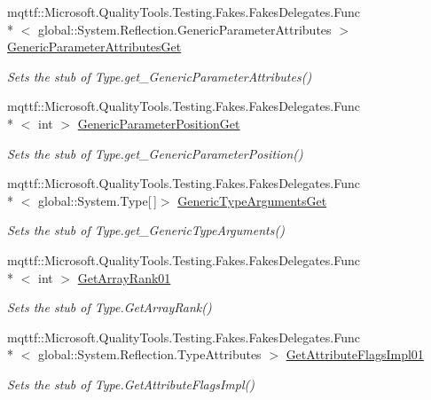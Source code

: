 \begin{DoxyCompactItemize}
mqttf\-::\-Microsoft.\-Quality\-Tools.\-Testing.\-Fakes.\-Fakes\-Delegates.\-Func\\*
$<$ global\-::\-System.\-Reflection.\-Generic\-Parameter\-Attributes $>$ \hyperlink{class_system_1_1_fakes_1_1_stub_type_adeba7a167b13b63eb2571e544e0340ac}{Generic\-Parameter\-Attributes\-Get}
\begin{DoxyCompactList}\small\item\em Sets the stub of Type.\-get\-\_\-\-Generic\-Parameter\-Attributes()\end{DoxyCompactList}\item 
mqttf\-::\-Microsoft.\-Quality\-Tools.\-Testing.\-Fakes.\-Fakes\-Delegates.\-Func\\*
$<$ int $>$ \hyperlink{class_system_1_1_fakes_1_1_stub_type_a82066736482e0b9313caa87f60b262e2}{Generic\-Parameter\-Position\-Get}
\begin{DoxyCompactList}\small\item\em Sets the stub of Type.\-get\-\_\-\-Generic\-Parameter\-Position()\end{DoxyCompactList}\item 
mqttf\-::\-Microsoft.\-Quality\-Tools.\-Testing.\-Fakes.\-Fakes\-Delegates.\-Func\\*
$<$ global\-::\-System.\-Type\mbox{[}$\,$\mbox{]}$>$ \hyperlink{class_system_1_1_fakes_1_1_stub_type_a16787b80f78426afb73499a5345a8b8b}{Generic\-Type\-Arguments\-Get}
\begin{DoxyCompactList}\small\item\em Sets the stub of Type.\-get\-\_\-\-Generic\-Type\-Arguments()\end{DoxyCompactList}\item 
mqttf\-::\-Microsoft.\-Quality\-Tools.\-Testing.\-Fakes.\-Fakes\-Delegates.\-Func\\*
$<$ int $>$ \hyperlink{class_system_1_1_fakes_1_1_stub_type_a5bc703f4f72f6cea430a19d056cd1b5d}{Get\-Array\-Rank01}
\begin{DoxyCompactList}\small\item\em Sets the stub of Type.\-Get\-Array\-Rank()\end{DoxyCompactList}\item 
mqttf\-::\-Microsoft.\-Quality\-Tools.\-Testing.\-Fakes.\-Fakes\-Delegates.\-Func\\*
$<$ global\-::\-System.\-Reflection.\-Type\-Attributes $>$ \hyperlink{class_system_1_1_fakes_1_1_stub_type_afdb0f5ae2c671e516805ec7fbc27e91b}{Get\-Attribute\-Flags\-Impl01}
\begin{DoxyCompactList}\small\item\em Sets the stub of Type.\-Get\-Attribute\-Flags\-Impl()\end{DoxyCompactList}\item 

\end{DoxyCompactItemize}
